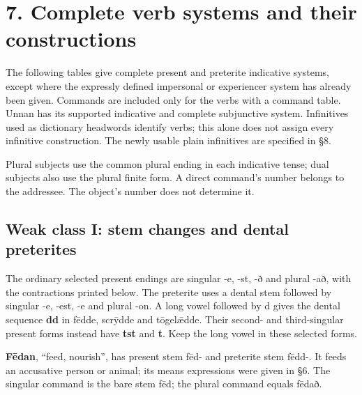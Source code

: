 \section*{7. Complete verb systems and their constructions}

The following tables give complete present and preterite indicative systems, except where the expressly defined impersonal or experiencer system has already been given. Commands are included only for the verbs with a command table. Unnan has its supported indicative and complete subjunctive system. Infinitives used as dictionary headwords identify verbs; this alone does not assign every infinitive construction. The newly usable plain infinitives are specified in §8.

Plural subjects use the common plural ending in each indicative tense; dual subjects also use the plural finite form. A direct command's number belongs to the addressee. The object's number does not determine it.

\subsection*{Weak class I: stem changes and dental preterites}

The ordinary selected present endings are singular -e, -st, -ð and plural -að, with the contractions printed below. The preterite uses a dental stem followed by singular -e, -est, -e and plural -on. A long vowel followed by d gives the dental sequence \textbf{dd} in fēdde, scrȳdde and tōgelǣdde. Their second- and third-singular present forms instead have \textbf{tst} and \textbf{t}. Keep the long vowel in these selected forms.

\textbf{Fēdan}, “feed, nourish”, has present stem fēd- and preterite stem fēdd-. It feeds an accusative person or animal; its means expressions were given in §6. The singular command is the bare stem fēd; the plural command equals fēdað.

